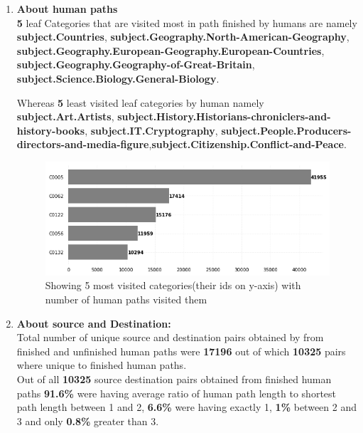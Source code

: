 \documentclass[12pt]{article}
\begin{document}
\begin{enumerate}
    \item \textbf{About human paths}\\
     \textbf{5} leaf Categories that are visited most in path finished by humans are namely \textbf{subject.Countries}, \textbf{subject.Geography.North-American-Geography},
    \textbf{subject.Geography.European-Geography.European-Countries}, \textbf{subject.Geography.Geography-of-Great-Britain},
    \textbf{subject.Science.Biology.General-Biology}.
    
    Whereas  \textbf{5} least visited leaf categories by human  namely \textbf{subject.Art.Artists}, \textbf{subject.History.Historians-chroniclers-and-history-books}, \textbf{subject.IT.Cryptography}, \textbf{subject.People.Producers-directors-and-media-figure},\textbf{subject.Citizenship.Conflict-and-Peace}.
    
\begin{figure}[H]
\includegraphics[scale=0.7]{bar1.png}
\caption{Showing 5 most visited categories(their ids on y-axis) with number of human paths visited them}
\end{figure}
    
    \item \textbf{About source and Destination:}\\
    \vspace{0.5cm}
    Total number of unique source and destination pairs obtained by from finished and unfinished human paths were \textbf{17196} out of which \textbf{10325} pairs where unique to finished human paths.\\
    \vspace{.5cm}
    Out of all \textbf{10325} source destination pairs obtained from finished human paths \textbf{91.6\%} were having average ratio of human path length to shortest path length between 1 and 2, \textbf{6.6\%} were having exactly 1, \textbf{1\%} between 2 and 3 and only \textbf{0.8\%} greater than 3. \
    

\end{enumerate}
\end{document}
